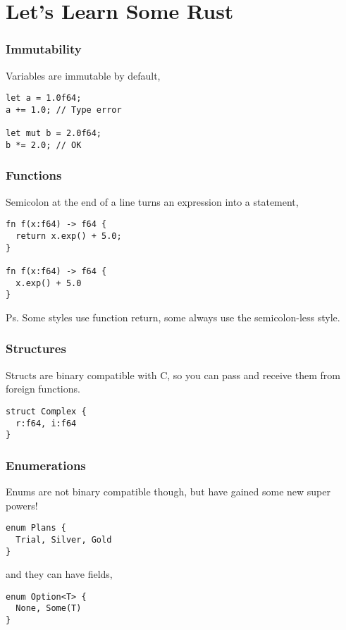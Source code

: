 \documentclass{beamer}
\begin{document}
\section{Let's Learn Some Rust}

\begin{frame}[fragile]
  \frametitle{Immutability}

  Variables are immutable by default,

  \begin{verbatim}
let a = 1.0f64;
a += 1.0; // Type error

let mut b = 2.0f64;
b *= 2.0; // OK
  \end{verbatim}
\end{frame}



\begin{frame}[fragile]
  \frametitle{Functions}

  Semicolon at the end of a line turns an expression into a statement,

  \begin{verbatim}
fn f(x:f64) -> f64 {
  return x.exp() + 5.0;
}

fn f(x:f64) -> f64 {
  x.exp() + 5.0
}
  \end{verbatim}
  
  Ps. Some styles use function return, some always use the semicolon-less style.
\end{frame}



\begin{frame}[fragile]
  \frametitle{Structures}

  Structs are binary compatible with C, so you can pass and receive them from foreign functions.

  \begin{verbatim}
struct Complex {
  r:f64, i:f64
}
  \end{verbatim}
\end{frame}



\begin{frame}[fragile]
  \frametitle{Enumerations}

  Enums are not binary compatible though, but have gained some new super powers!

  \begin{verbatim}
enum Plans {
  Trial, Silver, Gold
}
  \end{verbatim}
  
  and they can have fields,
  
  \begin{verbatim}
enum Option<T> {
  None, Some(T)
}
  \end{verbatim}
\end{frame}
\end{document}
